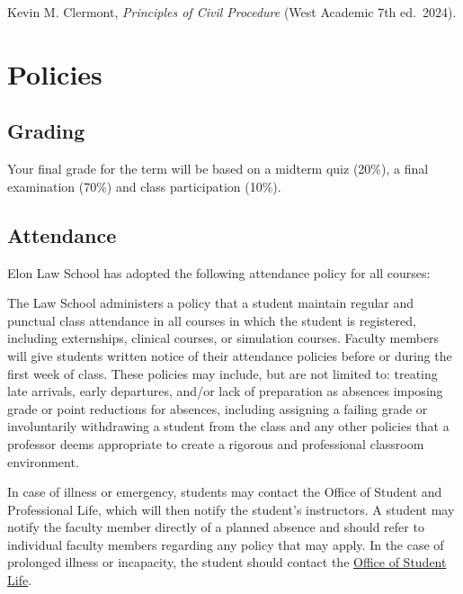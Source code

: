 \documentclass[11pt,letterpaper,twoside]{article}
\renewenvironment{quote}{%
   \list{}{%
     \leftmargin2em   %
     \rightmargin\leftmargin\parsep .1em }
   \item\relax
}
{\endlist}
\begin{document}

Kevin M. Clermont, \emph{Principles of Civil Procedure} (West Academic
7th ed.~2024).


\chapter*{Policies}\label{policies}


\section*{Grading}\label{grading}


Your final grade for the term will be based on a midterm quiz (20\%), a
final examination (70\%) and class participation (10\%).

\section*{Attendance}\label{attendance}


Elon Law School has adopted the following attendance policy for all
courses:

\begin{quote}
The Law School administers a policy that a student maintain regular and
punctual class attendance in all courses in which the student is
registered, including externships, clinical courses, or simulation
courses. Faculty members will give students written notice of their
attendance policies before or during the first week of class. These
policies may include, but are not limited to: treating late arrivals,
early departures, and/or lack of preparation as absences imposing grade
or point reductions for absences, including assigning a failing grade or
involuntarily withdrawing a student from the class and any other
policies that a professor deems appropriate to create a rigorous and
professional classroom environment.

In case of illness or emergency, students may contact the Office of
Student and Professional Life, which will then notify the student's
instructors. A student may notify the faculty member directly of a
planned absence and should refer to individual faculty members regarding
any policy that may apply. In the case of prolonged illness or
incapacity, the student should contact the
\href{https://www.elon.edu/u/law/students/}{Office of Student Life}.
\end{quote}
\end{document}
